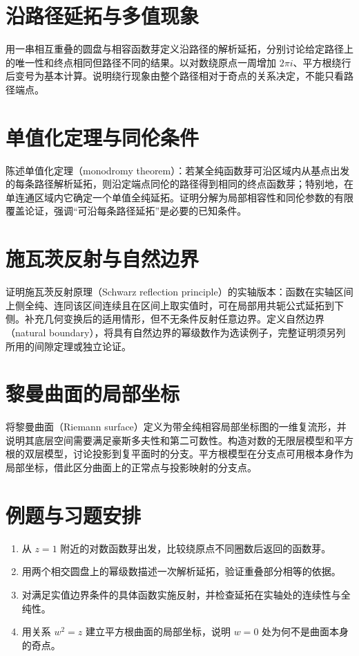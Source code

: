 \documentclass[UTF8,12pt,a4paper,fontset=fandol]{ctexbook}
\begin{document}
\section{沿路径延拓与多值现象}
用一串相互重叠的圆盘与相容函数芽定义沿路径的解析延拓，分别讨论给定路径上的唯一性和终点相同但路径不同的结果。以对数绕原点一周增加 $2\pi i$、平方根绕行后变号为基本计算。说明绕行现象由整个路径相对于奇点的关系决定，不能只看路径端点。

\section{单值化定理与同伦条件}
陈述单值化定理（monodromy theorem）：若某全纯函数芽可沿区域内从基点出发的每条路径解析延拓，则沿定端点同伦的路径得到相同的终点函数芽；特别地，在单连通区域内它确定一个单值全纯延拓。证明分解为局部相容性和同伦参数的有限覆盖论证，强调“可沿每条路径延拓”是必要的已知条件。

\section{施瓦茨反射与自然边界}
证明施瓦茨反射原理（Schwarz reflection principle）的实轴版本：函数在实轴区间上侧全纯、连同该区间连续且在区间上取实值时，可在局部用共轭公式延拓到下侧。补充几何变换后的适用情形，但不无条件反射任意边界。定义自然边界（natural boundary），将具有自然边界的幂级数作为选读例子，完整证明须另列所用的间隙定理或独立论证。

\section{黎曼曲面的局部坐标}
将黎曼曲面（Riemann surface）定义为带全纯相容局部坐标图的一维复流形，并说明其底层空间需要满足豪斯多夫性和第二可数性。构造对数的无限层模型和平方根的双层模型，讨论投影到复平面时的分支。平方根模型在分支点可用根本身作为局部坐标，借此区分曲面上的正常点与投影映射的分支点。

\section{例题与习题安排}
\begin{enumerate}
  \item 从 $z=1$ 附近的对数函数芽出发，比较绕原点不同圈数后返回的函数芽。
  \item 用两个相交圆盘上的幂级数描述一次解析延拓，验证重叠部分相等的依据。
  \item 对满足实值边界条件的具体函数实施反射，并检查延拓在实轴处的连续性与全纯性。
  \item 用关系 $w^2=z$ 建立平方根曲面的局部坐标，说明 $w=0$ 处为何不是曲面本身的奇点。
\end{enumerate}
\end{document}

